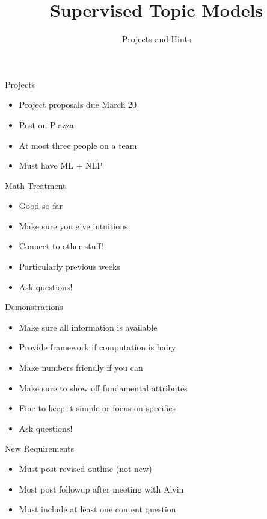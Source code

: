 \documentclass[compress]{beamer}
\title{Supervised Topic Models}
\date{Projects and Hints}
\begin{document}
\frame{\titlepage
}

\begin{frame}{Projects}

  \begin{itemize}
    \item Project proposals due March 20
    \item Post on Piazza
    \item At most three people on a team
    \item Must have ML + NLP
  \end{itemize}

\end{frame}


\begin{frame}{Math Treatment}

  \begin{itemize}
    \item Good so far
    \item Make sure you give intuitions
    \item Connect to other stuff!
    \item Particularly previous weeks
    \item Ask questions!
  \end{itemize}

\end{frame}

\begin{frame}{Demonstrations}

  \begin{itemize}
    \item Make sure all information is available
    \item Provide framework if computation is hairy
    \item Make numbers friendly if you can
    \item Make sure to show off fundamental attributes
    \item Fine to keep it simple or focus on specifics
    \item Ask questions!
  \end{itemize}
\end{frame}


\begin{frame}{New Requirements}

  \begin{itemize}
    \item Must post revised outline (not new)
    \item Most post followup after meeting with Alvin
    \item Must include at least one content question
  \end{itemize}

\end{frame}
\end{document}
